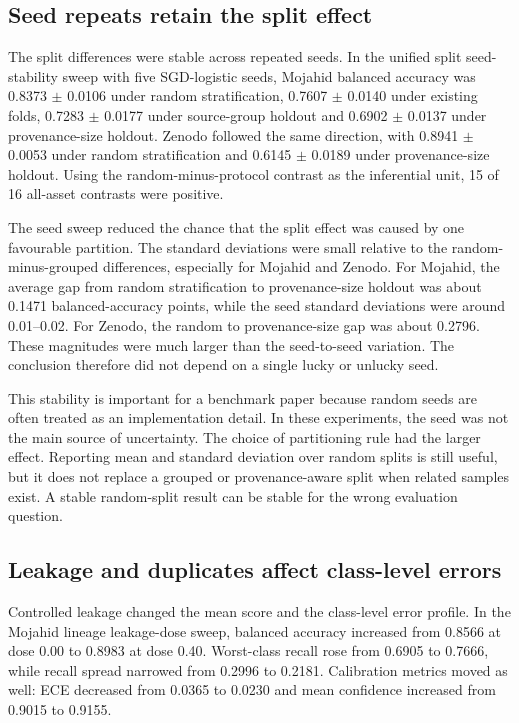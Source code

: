 \documentclass[]{interact}
\begin{document}
\subsection{Seed repeats retain the split effect}

The split differences were stable across repeated seeds. In the unified split seed-stability sweep with five SGD-logistic seeds, Mojahid balanced accuracy was 0.8373 \(\pm\) 0.0106 under random stratification, 0.7607 \(\pm\) 0.0140 under existing folds, 0.7283 \(\pm\) 0.0177 under source-group holdout and 0.6902 \(\pm\) 0.0137 under provenance-size holdout. Zenodo followed the same direction, with 0.8941 \(\pm\) 0.0053 under random stratification and 0.6145 \(\pm\) 0.0189 under provenance-size holdout. Using the random-minus-protocol contrast as the inferential unit, 15 of 16 all-asset contrasts were positive.

The seed sweep reduced the chance that the split effect was caused by one favourable partition. The standard deviations were small relative to the random-minus-grouped differences, especially for Mojahid and Zenodo. For Mojahid, the average gap from random stratification to provenance-size holdout was about 0.1471 balanced-accuracy points, while the seed standard deviations were around 0.01--0.02. For Zenodo, the random to provenance-size gap was about 0.2796. These magnitudes were much larger than the seed-to-seed variation. The conclusion therefore did not depend on a single lucky or unlucky seed.

This stability is important for a benchmark paper because random seeds are often treated as an implementation detail. In these experiments, the seed was not the main source of uncertainty. The choice of partitioning rule had the larger effect. Reporting mean and standard deviation over random splits is still useful, but it does not replace a grouped or provenance-aware split when related samples exist. A stable random-split result can be stable for the wrong evaluation question.

\subsection{Leakage and duplicates affect class-level errors}

Controlled leakage changed the mean score and the class-level error profile. In the Mojahid lineage leakage-dose sweep, balanced accuracy increased from 0.8566 at dose 0.00 to 0.8983 at dose 0.40. Worst-class recall rose from 0.6905 to 0.7666, while recall spread narrowed from 0.2996 to 0.2181. Calibration metrics moved as well: ECE decreased from 0.0365 to 0.0230 and mean confidence increased from 0.9015 to 0.9155.
\end{document}
